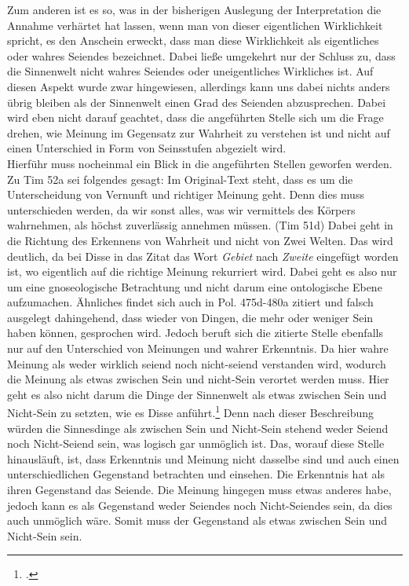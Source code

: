 Zum anderen ist es so, was in der bisherigen Auslegung der Interpretation die Annahme verhärtet hat lassen, wenn man von dieser eigentlichen Wirklichkeit spricht, es den Anschein erweckt, dass man diese Wirklichkeit als eigentliches oder wahres Seiendes bezeichnet. Dabei ließe umgekehrt nur der Schluss zu, dass die Sinnenwelt nicht wahres Seiendes oder uneigentliches Wirkliches ist. Auf diesen Aspekt wurde zwar hingewiesen, allerdings kann uns dabei nichts anders übrig bleiben als der Sinnenwelt einen Grad des Seienden abzusprechen. Dabei wird eben nicht darauf geachtet, dass die angeführten Stelle sich um die Frage drehen, wie Meinung im Gegensatz zur Wahrheit zu verstehen ist und nicht auf einen Unterschied in Form von Seinsstufen abgezielt wird.\\ Hierführ muss nocheinmal ein Blick in die angeführten Stellen geworfen werden. 
Zu Tim 52a sei folgendes gesagt: Im Original-Text steht, dass es um die Unterscheidung von Vernunft und richtiger Meinung geht. Denn dies muss unterschieden werden, da wir sonst alles, was wir vermittels des Körpers wahrnehmen, als höchst zuverlässig annehmen müssen. (Tim 51d) Dabei geht in die Richtung des Erkennens von Wahrheit und nicht von Zwei Welten. Das wird deutlich, da bei Disse in das Zitat das Wort \emph{Gebiet} nach \emph{Zweite} eingefügt worden ist, wo eigentlich auf die richtige Meinung rekurriert wird. Dabei geht es also nur um eine gnoseologische Betrachtung und nicht darum eine ontologische Ebene aufzumachen.
Ähnliches findet sich auch in Pol. 475d-480a zitiert und falsch ausgelegt dahingehend, dass wieder von Dingen, die mehr oder weniger Sein haben können, gesprochen wird. Jedoch beruft sich die zitierte Stelle ebenfalls nur auf den Unterschied von Meinungen und wahrer Erkenntnis. Da hier wahre Meinung als weder wirklich seiend noch nicht-seiend verstanden wird, wodurch die Meinung als etwas zwischen Sein und nicht-Sein verortet werden muss. Hier geht es also nicht darum die Dinge der Sinnenwelt als etwas zwischen Sein und Nicht-Sein zu setzten, wie es Disse anführt.\footcite[vgl.][S. 38]{DisseMetaphysik} 
Denn nach dieser Beschreibung würden die Sinnesdinge als zwischen Sein und Nicht-Sein stehend weder Seiend noch Nicht-Seiend sein, was logisch gar unmöglich ist.   
Das, worauf diese Stelle hinausläuft, ist, dass Erkenntnis und Meinung nicht dasselbe sind und auch einen unterschiedlichen Gegenstand betrachten und einsehen. Die Erkenntnis hat als ihren Gegenstand das Seiende. Die Meinung hingegen muss etwas anderes habe, jedoch kann es als Gegenstand weder Seiendes noch Nicht-Seiendes sein, da dies auch unmöglich wäre. Somit muss der Gegenstand als etwas zwischen Sein und Nicht-Sein sein. 
